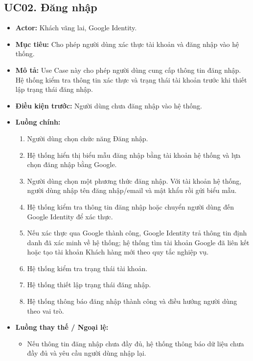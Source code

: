 \documentclass[12pt,a4paper]{article}
\begin{document}

\subsection{UC02. Đăng nhập}

\begin{itemize}
    \item \textbf{Actor:} Khách vãng lai, Google Identity.
    \item \textbf{Mục tiêu:} Cho phép người dùng xác thực tài khoản và đăng nhập vào hệ thống.
    \item \textbf{Mô tả:} Use Case này cho phép người dùng cung cấp thông tin đăng nhập. Hệ thống kiểm tra thông tin xác thực và trạng thái tài khoản trước khi thiết lập trạng thái đăng nhập.
    \item \textbf{Điều kiện trước:} Người dùng chưa đăng nhập vào hệ thống.
    \item \textbf{Luồng chính:}
    \begin{enumerate}
        \item Người dùng chọn chức năng Đăng nhập.
        \item Hệ thống hiển thị biểu mẫu đăng nhập bằng tài khoản hệ thống và lựa chọn đăng nhập bằng Google.
        \item Người dùng chọn một phương thức đăng nhập. Với tài khoản hệ thống, người dùng nhập tên đăng nhập/email và mật khẩu rồi gửi biểu mẫu.
        \item Hệ thống kiểm tra thông tin đăng nhập hoặc chuyển người dùng đến Google Identity để xác thực.
        \item Nếu xác thực qua Google thành công, Google Identity trả thông tin định danh đã xác minh về hệ thống; hệ thống tìm tài khoản Google đã liên kết hoặc tạo tài khoản Khách hàng mới theo quy tắc nghiệp vụ.
        \item Hệ thống kiểm tra trạng thái tài khoản.
        \item Hệ thống thiết lập trạng thái đăng nhập.
        \item Hệ thống thông báo đăng nhập thành công và điều hướng người dùng theo vai trò.
    \end{enumerate}
    \item \textbf{Luồng thay thế / Ngoại lệ:}
    \begin{itemize}
        \item Nếu thông tin đăng nhập chưa đầy đủ, hệ thống thông báo dữ liệu chưa đầy đủ và yêu cầu người dùng nhập lại.

\end{itemize}
\end{itemize}
\end{document}
